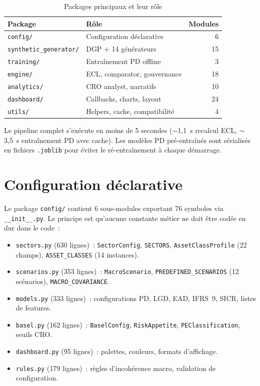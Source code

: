 \documentclass[12pt, a4paper, twoside, openright]{report}
\theoremstyle{definition}
\begin{document}
\begin{table}[htbp]
\centering
\caption{Packages principaux et leur rôle}
\label{tab:packages}
\begin{tabular}{llr}
\toprule
\textbf{Package} & \textbf{Rôle} & \textbf{Modules} \\
\midrule
\texttt{config/} & Configuration déclarative & 6 \\
\texttt{synthetic\_generator/} & DGP + 14 générateurs & 15 \\
\texttt{training/} & Entraînement PD offline & 3 \\
\texttt{engine/} & ECL, comparator, gouvernance & 18 \\
\texttt{analytics/} & CRO analyst, narratifs & 10 \\
\texttt{dashboard/} & Callbacks, charts, layout & 24 \\
\texttt{utils/} & Helpers, cache, compatibilité & 4 \\
\bottomrule
\end{tabular}
\end{table}

Le pipeline complet s'exécute en moins de 5 secondes ($\sim$1,1~s recalcul ECL, $\sim$3,5~s entraînement PD avec cache). Les modèles PD pré-entraînés sont sérialisés en fichiers \texttt{.joblib} pour éviter le ré-entraînement à chaque démarrage.

\section{Configuration déclarative}
\label{sec:archi-config}

Le package \texttt{config/} contient 6 sous-modules exportant 76 symboles via \texttt{\_\_init\_\_.py}. Le principe est qu'aucune constante métier ne doit être codée en dur dans le code~:

\begin{itemize}
\item \texttt{sectors.py} (630 lignes)~: \texttt{SectorConfig}, \texttt{SECTORS}, \texttt{AssetClassProfile} (22 champs), \texttt{ASSET\_CLASSES} (14 instances).
\item \texttt{scenarios.py} (353 lignes)~: \texttt{MacroScenario}, \texttt{PREDEFINED\_SCENARIOS} (12 scénarios), \texttt{MACRO\_COVARIANCE}.
\item \texttt{models.py} (333 lignes)~: configurations PD, LGD, EAD, IFRS~9, SICR, listes de features.
\item \texttt{basel.py} (162 lignes)~: \texttt{BaselConfig}, \texttt{RiskAppetite}, \texttt{PEClassification}, seuils CRO.
\item \texttt{dashboard.py} (95 lignes)~: palettes, couleurs, formats d'affichage.
\item \texttt{rules.py} (179 lignes)~: règles d'incohérence macro, validation de configuration.
\end{itemize}
\end{document}
